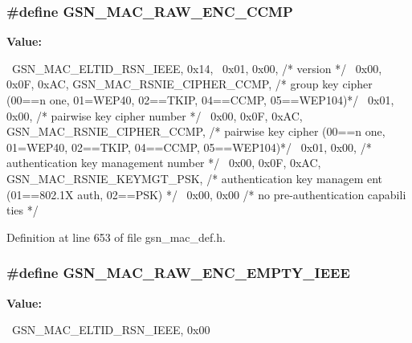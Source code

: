 \hypertarget{a00522_af9645e02bccd38d54ca4457c95602515}{
\subsubsection[{GSN\_\-MAC\_\-RAW\_\-ENC\_\-CCMP}]{\setlength{\rightskip}{0pt plus 5cm}\#define GSN\_\-MAC\_\-RAW\_\-ENC\_\-CCMP}}
\label{a00522_af9645e02bccd38d54ca4457c95602515}
{\bfseries Value:}
\begin{DoxyCode}
{{                                                                               
              \
    GSN_MAC_ELTID_RSN_IEEE, 0x14,                                                
                  \
    0x01, 0x00,                                 /* version                       
                                                */ \
    0x00, 0x0F, 0xAC, GSN_MAC_RSNIE_CIPHER_CCMP,    /* group key cipher    (00==n
      one, 01=WEP40, 02==TKIP, 04==CCMP, 05==WEP104)*/ \
    0x01, 0x00,                                 /* pairwise key cipher number    
                                                */ \
    0x00, 0x0F, 0xAC, GSN_MAC_RSNIE_CIPHER_CCMP,    /* pairwise key cipher (00==n
      one, 01=WEP40, 02==TKIP, 04==CCMP, 05==WEP104)*/ \
    0x01, 0x00,                                 /* authentication key management 
      number                                    */ \
    0x00, 0x0F, 0xAC, GSN_MAC_RSNIE_KEYMGT_PSK,     /* authentication key managem
      ent (01==802.1X auth, 02==PSK)                */ \
    0x00, 0x00                                  /* no pre-authentication capabili
      ties   */                                    \
}}
\end{DoxyCode}


Definition at line 653 of file gsn\_\-mac\_\-def.h.

\hypertarget{a00522_a0184f7bca23d8fbf8e1e34218dfdc5cd}{
\subsubsection[{GSN\_\-MAC\_\-RAW\_\-ENC\_\-EMPTY\_\-IEEE}]{\setlength{\rightskip}{0pt plus 5cm}\#define GSN\_\-MAC\_\-RAW\_\-ENC\_\-EMPTY\_\-IEEE}}
\label{a00522_a0184f7bca23d8fbf8e1e34218dfdc5cd}
{\bfseries Value:}
\begin{DoxyCode}
{{                                                                               
              \
    GSN_MAC_ELTID_RSN_IEEE, 0x00                                                 
                  \
}}
\end{DoxyCode}


